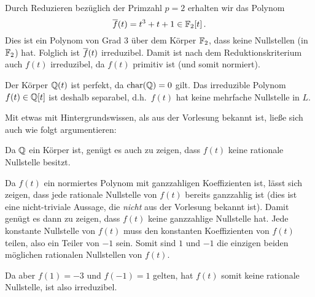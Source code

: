 \section{}





\subsection{}

Durch Reduzieren bezüglich der Primzahl $p = 2$ erhalten wir das Polynom
\[
      \overline{f}(t)
  =   t^3 + t + 1
  \in \mathbb{F}_{2}[t] \,.
\]
Dies ist ein Polynom von Grad $3$ über dem Körper $\mathbb{F}_{2}$, dass keine Nullstellen (in $\mathbb{F}_{2}$) hat.
Folglich ist $\overline{f}(t)$ irreduzibel.
Damit ist nach dem Reduktionskriterium auch $f(t)$ irreduzibel, da $f(t)$ primitiv ist (und somit normiert).

Der Körper $\mathbb{Q}(t)$ ist perfekt, da $\operatorname{char}(\mathbb{Q}) = 0$ gilt.
Das irreduzible Polynom $f(t) \in \mathbb{Q}[t]$ ist deshalb separabel, d.h.\ $f(t)$ hat keine mehrfache Nullstelle in $L$.

\begin{remark}
  Mit etwas mit Hintergrundswissen, als aus der Vorlesung bekannt ist, ließe sich auch wie folgt argumentieren:
  
  Da $\mathbb{Q}$ ein Körper ist, genügt es auch zu zeigen, dass $f(t)$ keine rationale Nullstelle besitzt.
  
  Da $f(t)$ ein normiertes Polynom mit ganzzahligen Koeffizienten ist, lässt sich zeigen, dass jede rationale Nullstelle von $f(t)$ bereits ganzzahlig ist (dies ist eine nicht-triviale Aussage, die \emph{nicht} aus der Vorlesung bekannt ist).
  Damit genügt es dann zu zeigen, dass $f(t)$ keine ganzzahlige Nullstelle hat.
  Jede konstante Nullstelle von $f(t)$ muss den konstanten Koeffizienten von $f(t)$ teilen, also ein Teiler von $-1$ sein.
  Somit sind $1$ und $-1$ die einzigen beiden möglichen rationalen Nullstellen von $f(t)$.
  
  Da aber $f(1) = -3$ und $f(-1) = 1$ gelten, hat $f(t)$ somit keine rationale Nullstelle, ist also irreduzibel.
\end{remark}






\subsection{}

